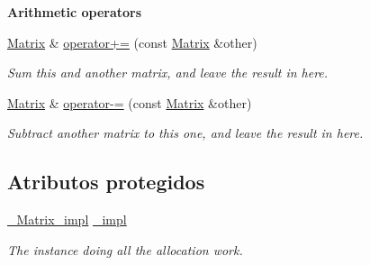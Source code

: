 \begin{Indent}\textbf{ Arithmetic operators}\par
\begin{DoxyCompactItemize}
\item 
\hyperlink{classanpi_1_1Matrix}{Matrix} \& \hyperlink{classanpi_1_1Matrix_a41117c04ff2155dbf8c7af63dd82c245}{operator+=} (const \hyperlink{classanpi_1_1Matrix}{Matrix} \&other)
\begin{DoxyCompactList}\small\item\em Sum this and another matrix, and leave the result in here. \end{DoxyCompactList}\item 
\hyperlink{classanpi_1_1Matrix}{Matrix} \& \hyperlink{classanpi_1_1Matrix_aedd6690382a1f26e2300ba25bb389b8b}{operator-\/=} (const \hyperlink{classanpi_1_1Matrix}{Matrix} \&other)
\begin{DoxyCompactList}\small\item\em Subtract another matrix to this one, and leave the result in here. \end{DoxyCompactList}\end{DoxyCompactItemize}
\end{Indent}
\subsection*{Atributos protegidos}
\begin{DoxyCompactItemize}
\item 
\hyperlink{structanpi_1_1Matrix_1_1__Matrix__impl}{\+\_\+\+Matrix\+\_\+impl} \hyperlink{classanpi_1_1Matrix_ac6084447aba4417abc18f378f3378e8f}{\+\_\+impl}
\begin{DoxyCompactList}\small\item\em The instance doing all the allocation work. \end{DoxyCompactList}\end{DoxyCompactItemize}
